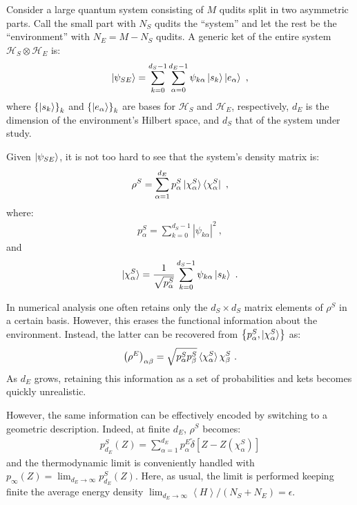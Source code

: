 \documentclass[draft,nofootinbib,pre,twocolumn,showpacs,showkeys,preprintnumbers,floatfix]{revtex4-1}
\newcommand{\1}{\mathbbm{1}}
\newcommand{\MV}[1]{\left\langle #1 \right\rangle}
\begin{document}
Consider a large quantum system consisting of $M$ qudits split in two
asymmetric parts. Call the small part with $N_S$ qudits the ``system'' and
let the rest be the ``environment'' with $N_E = M-N_S$ qudits. A generic ket
of the entire system $\mathcal{H}_S \otimes \mathcal{H}_E$ is:
\begin{align*}
\ket{\psi_{SE}} = \sum_{k=0}^{d_S-1} \sum_{\alpha=0}^{d_E-1}
  \psi_{k\alpha}\ket{s_k}\ket{e_\alpha}
  ~,
\end{align*}
where $\left\{\ket{s_k}\right\}_k$ and $\left\{\ket{e_\alpha}\right\}_k$ are
bases for $\mathcal{H}_S$ and $\mathcal{H}_E$, respectively, $d_E$ is the
dimension of the environment's Hilbert space, and $d_S$ that of the system
under study.

Given $\ket{\psi_{SE}}$, it is not too hard to see that the system's density matrix is:
\begin{align}
\rho^S = \sum_{\alpha=1}^{d_E} p_\alpha^S \ket{\chi_\alpha^S} \bra{\chi_\alpha^S}\label{eq:reducedS}
  ~,
\end{align}
where:
\begin{align*}
p_\alpha^S = \sum_{k=0}^{d_S-1} \left\vert \psi_{k\alpha} \right\vert^2
  ~,
\end{align*}
and
\begin{align*}
\ket{\chi_\alpha^S} = \frac{1}{\sqrt{p_\alpha^S}} \sum_{k=0}^{d_S-1} \psi_{k\alpha}\ket{s_k}
  ~.
\end{align*}

In numerical analysis one often retains only the $d_S \times d_S$ matrix
elements of $\rho^S$ in a certain basis. However, this erases the functional
information about the environment. Instead, the latter can be recovered from
$\left\{ p_\alpha^S, \ket{\chi_\alpha^S}\right\}$ as:
\begin{align*}
\left(\rho^E\right)_{\alpha\beta}
  = \sqrt{p_\alpha^S p_\beta^S}\braket{\chi_\alpha^S}{\chi_\beta^S}
  ~.
\end{align*}
As $d_E$ grows, retaining this information as a set of probabilities and 
kets becomes quickly unrealistic.

However, the same information can be effectively encoded by switching to a
geometric description. Indeed, at finite $d_E$, $\rho^S$ becomes:
\begin{align*}
p^S_{d_E}(Z) = \sum_{\alpha=1}^{d_E}p_\alpha^E
  \tilde{\delta}\left[ Z - Z(\chi_\alpha^S)\right]
\end{align*}
and the thermodynamic limit is conveniently handled with $p_\infty(Z) =
\lim_{d_E \to \infty} p^S_{d_E}(Z)$. Here, as usual, the limit is performed
keeping finite the average energy density $\lim_{d_E \to \infty} \MV{H}/(N_S +
N_E) = \epsilon$.
\end{document}
